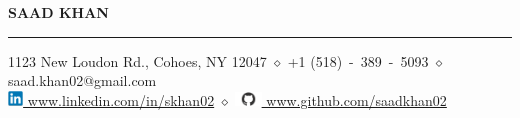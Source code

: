 \documentclass{article}
\begin{document}
%
\begin{center}
    {\MakeUppercase{\huge\bf Saad Khan}} \\
    \bigskip
    \hrule
    \bigskip
    1123 New Loudon Rd., Cohoes, NY 12047
    $\diamond$
    +1 (518)~-~389~-~5093
    $\diamond$
    saad.khan02@gmail.com
    \\
    \href{https://www.linkedin.com/in/skhan02}
         {\includegraphics[width=4mm]{linkedin.png} www.linkedin.com/in/skhan02}
    $\diamond$
    \href{https://www.github.com/saadkhan02}
         {\includegraphics[width=7mm]{github.png} www.github.com/saadkhan02}
    \\
    \smallskip
\end{center}

%
\end{document}
